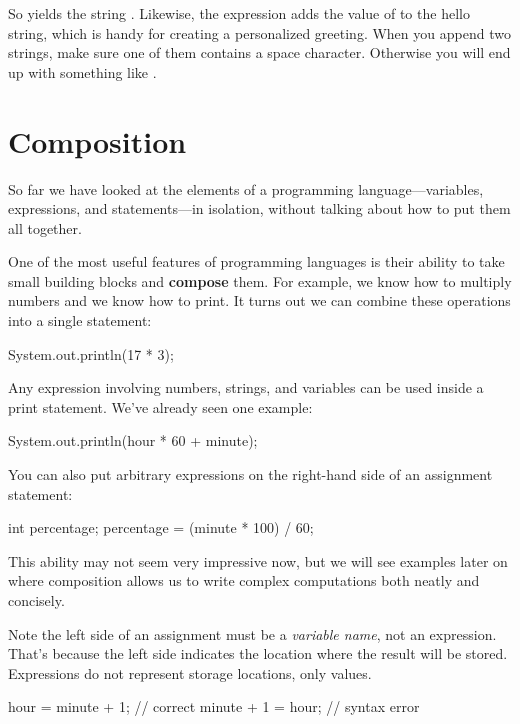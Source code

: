 So  yields the string .
Likewise, the expression  adds the value of  to the hello string, which is handy for creating a personalized greeting.
When you append two strings, make sure one of them contains a space character.
Otherwise you will end up with something like .


\section{Composition}


So far we have looked at the elements of a programming language---variables, expressions, and statements---in isolation, without talking about how to put them all together.

One of the most useful features of programming languages is their ability to take small building blocks and {\bf compose} them.
For example, we know how to multiply numbers and we know how to print.
It turns out we can combine these operations into a single statement:

\begin{code}
    System.out.println(17 * 3);
\end{code}

Any expression involving numbers, strings, and variables can be used inside a print statement.
We've already seen one example:

\begin{code}
    System.out.println(hour * 60 + minute);
\end{code}

You can also put arbitrary expressions on the right-hand side of an assignment statement:

\begin{code}
    int percentage;
    percentage = (minute * 100) / 60;
\end{code}

This ability may not seem very impressive now, but we will see examples later on where composition allows us to write complex computations both neatly and concisely.

Note the left side of an assignment must be a {\em variable name}, not an expression.
That's because the left side indicates the location where the result will be stored.
Expressions do not represent storage locations, only values.

\begin{code}
    hour = minute + 1;  // correct
    minute + 1 = hour;  // syntax error
\end{code}


